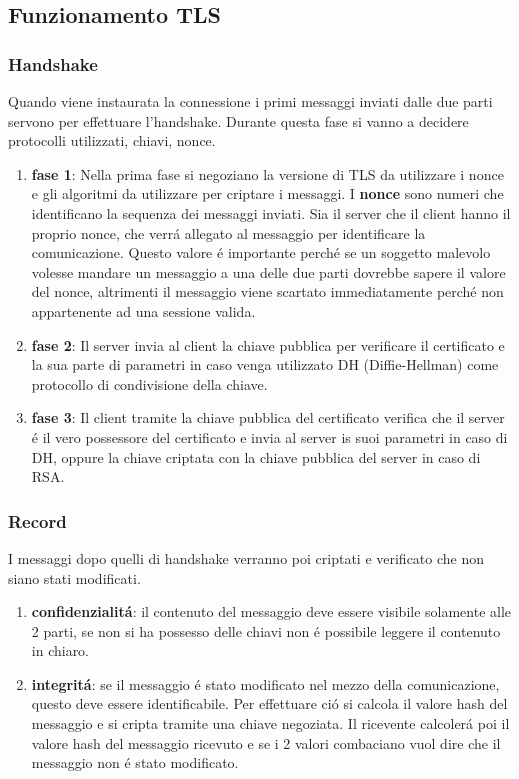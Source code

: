 \subsection{Funzionamento TLS}
\subsubsection{Handshake}
Quando viene instaurata la connessione i primi messaggi inviati dalle due parti servono per effettuare l'handshake. Durante questa fase si vanno a decidere protocolli utilizzati, chiavi, nonce.
\begin{enumerate}
  \item \textbf{fase 1}: Nella prima fase si negoziano la versione di TLS da utilizzare i nonce e gli algoritmi da utilizzare per criptare i messaggi. I \textbf{nonce} sono numeri che identificano la sequenza dei messaggi inviati. Sia il server che il client hanno il proprio nonce, che verrá allegato al messaggio per identificare la comunicazione. Questo valore é importante perché se un soggetto malevolo volesse mandare un messaggio a una delle due parti dovrebbe sapere il valore del nonce, altrimenti il messaggio viene scartato immediatamente perché non appartenente ad una sessione valida.
  \item \textbf{fase 2}: Il server invia al client la chiave pubblica per verificare il certificato e la sua parte di parametri in caso venga utilizzato DH (Diffie-Hellman) come protocollo di condivisione della chiave.
  \item \textbf{fase 3}: Il client tramite la chiave pubblica del certificato verifica che il server é il vero possessore del certificato e invia al server is suoi parametri in caso di DH, oppure la chiave criptata con la chiave pubblica del server in caso di RSA.
\end{enumerate}
\subsubsection{Record}
I messaggi dopo quelli di handshake verranno poi criptati e verificato che non siano stati modificati.
\begin{enumerate}
\item \textbf{confidenzialitá}: il contenuto del messaggio deve essere visibile solamente alle 2 parti, se non si ha possesso delle chiavi non é possibile leggere il contenuto in chiaro.
\item \textbf{integritá}: se il messaggio é stato modificato nel mezzo della comunicazione, questo deve essere identificabile. Per effettuare ció si calcola il valore hash del messaggio e si cripta tramite una chiave negoziata. Il ricevente calcolerá poi il valore hash del messaggio ricevuto e se i 2 valori combaciano vuol dire che il messaggio non é stato modificato.
\end{enumerate}

